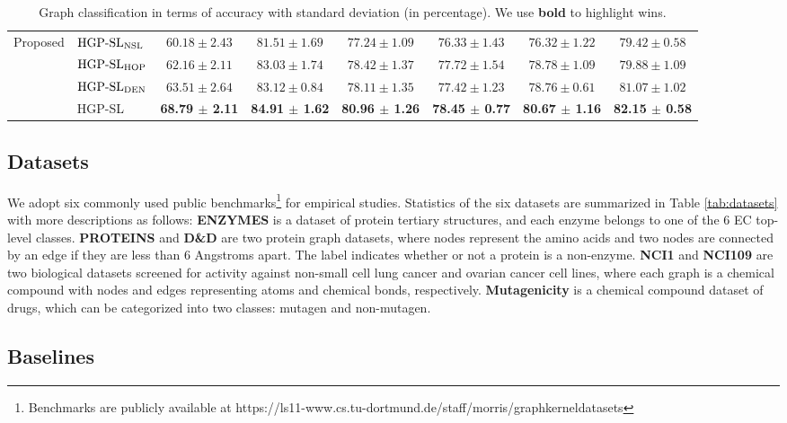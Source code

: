 \documentclass[letterpaper]{article} \usepackage{aaai20}  \usepackage{times}  \usepackage{helvet} \usepackage{courier}  \usepackage[hyphens]{url}  \usepackage{graphicx} \urlstyle{rm} \def\UrlFont{\rm}  \usepackage{graphicx}  \frenchspacing  \setlength{\pdfpagewidth}{8.5in}  \setlength{\pdfpageheight}{11in}
\begin{document}
\begin{table*}
\begin{tabular}{ llcccccc }
    \multirow{4}{*}{Proposed} 	& $\text{HGP-SL}_{{\rm NSL}}$	& $60.18\pm2.43$	& $81.51\pm1.69$	& $77.24\pm1.09$  	& $76.33\pm1.43$		& $76.32\pm1.22$								& $79.42\pm0.58$			\\
    							& $\text{HGP-SL}_{{\rm HOP}}$	& $62.16\pm2.11$	& $83.03\pm1.74$	& $78.42\pm1.37$  	& $77.72\pm1.54$			& $78.78\pm1.09$	& $79.88\pm1.09$			\\
    							& $\text{HGP-SL}_{{\rm DEN}}$	& $63.51\pm2.64$	& $83.12\pm0.84$	& $78.11\pm1.35$  	& $77.42\pm1.23$			& $78.76\pm0.61$	& $81.07\pm1.02$			\\
    							& HGP-SL	& \textbf{68.79 $\pm$ 2.11} & \textbf{84.91 $\pm$ 1.62} & \textbf{80.96 $\pm$ 1.26} & \textbf{78.45 $\pm$ 0.77}	& \textbf{80.67 $\pm$ 1.16} & \textbf{82.15 $\pm$ 0.58}	\\
    \bottomrule[0.8pt]
    \end{tabular}
    \caption{Graph classification in terms of accuracy with standard deviation (in percentage). We use \textbf{bold} to highlight wins.}
    \label{tab:classification_result}
\end{table*}

\subsection{Datasets}
We adopt six commonly used public benchmarks\footnote{Benchmarks are publicly available at https://ls11-www.cs.tu-dortmund.de/staff/morris/graphkerneldatasets} for empirical studies. Statistics of the six datasets are summarized in Table \ref{tab:datasets} with more descriptions as follows: \textbf{ENZYMES} \cite{borgwardt2005protein} is a dataset of protein tertiary structures, and each enzyme belongs to one of the 6 EC top-level classes. \textbf{PROTEINS} and \textbf{D\&D} \cite{dobson2003distinguishing} are two protein graph datasets, where nodes represent the amino acids and two nodes are connected by an edge if they are less than 6 Angstroms apart. The label indicates whether or not a protein is a non-enzyme. \textbf{NCI1} and \textbf{NCI109} \cite{shervashidze2011weisfeiler} are two biological datasets screened for activity against non-small cell lung cancer and ovarian cancer cell lines, where each graph is a chemical compound with nodes and edges representing atoms and chemical bonds, respectively. \textbf{Mutagenicity} \cite{kazius2005derivation} is a chemical compound dataset of drugs, which can be categorized into two classes: mutagen and non-mutagen.

\subsection{Baselines}
\end{document}
